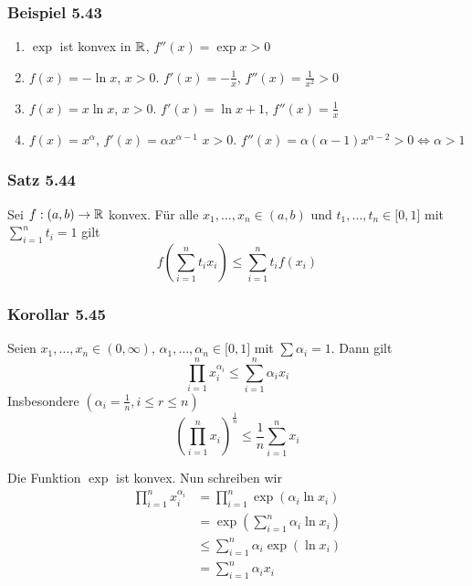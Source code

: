 \subsubsection*{Beispiel 5.43}
\begin{enumerate}
\item $\exp$ ist konvex in $\mathbb{R}$, $f''(x)=\exp x>0$
\item $f(x)=-\ln x$, $x>0$. $f'(x)=-\frac{1}{x}$, $f''(x)=\frac{1}{x^2}>0$
\item $f(x)=x\ln x$, $x>0$. $f'(x)=\ln x +1$, $f''(x)=\frac{1}{x}$
\item $f(x)=x^\alpha $, $f'(x)=\alpha x^{\alpha-1}$ $x>0$. $f''(x)=\alpha(\alpha-1)x^{\alpha-2}>0\Leftrightarrow \alpha >1$
\end{enumerate}

\subsubsection*{Satz 5.44}
Sei $f:(a,b)\to\mathbb{R}$ konvex. Für alle $x_1,\dots,x_n\in(a,b)$ und $t_1,\dots,t_n\in\lbrack 0,1\rbrack$ mit $\sum\limits_{i=1}^n t_i=1$ gilt
\[f\left( \sum\limits_{i=1}^n t_ix_i\right)\leq  \sum\limits_{i=1}^n t_if(x_i)\]

\subsubsection*{Korollar 5.45}
Seien $x_1,\dots, x_n\in (0,\infty)$, $\alpha_1,\dots,\alpha_n\in\lbrack 0,1\rbrack$ mit $\sum\alpha_i=1$. Dann gilt
\[\prod\limits_{i = 1}^n {x_i^{{\alpha _i}}}  \le \sum\limits_{i = 1}^n {{\alpha _i}{x_i}} \]
Insbesondere $\left( \alpha_i=\frac{1}{n}, i\leq r\leq n\right)$
\[{\left( {\prod\limits_{i = 1}^n {{x_i}} } \right)^{\frac{1}{n}}} \le \frac{1}{n}\sum\limits_{i = 1}^n {{x_i}} \]

\begin{beweis}{}
Die Funktion $\exp$ ist konvex. Nun schreiben wir
\begin{align*}
\prod\limits_{i = 1}^n {x_i^{{\alpha _i}}}  &= \prod\limits_{i = 1}^n {\exp ({\alpha _i}\ln {x_i})} \\
&=\exp\left( \sum\limits_{i=1}^n \alpha_i \ln x_i\right)\\
&\leq \sum\limits_{i=1}^n \alpha_i \exp\left(\ln x_i\right)\\
&=\sum\limits_{i=1}^n\alpha_i x_i
\end{align*}
\end{beweis}

